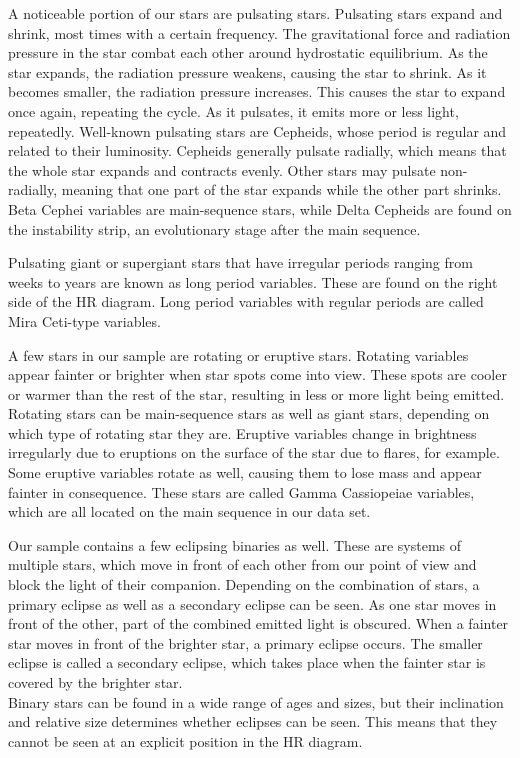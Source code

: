 \documentclass[onecolumn]{aa} %
\begin{document}
  A noticeable portion of our stars are pulsating stars.
  Pulsating stars expand and shrink, most times with a certain frequency. The gravitational force and radiation pressure in the star combat each other around hydrostatic equilibrium. As the star expands, the radiation pressure weakens, causing the star to shrink. As it becomes smaller, the radiation pressure increases. This causes the star to expand once again, repeating the cycle. As it pulsates, it emits more or less light, repeatedly.
Well-known pulsating stars are Cepheids, whose period is regular and related to their luminosity. Cepheids generally pulsate radially, which means that the whole star expands and contracts evenly. Other stars may pulsate non-radially, meaning that one part of the star expands while the other part shrinks. Beta Cephei variables are main-sequence stars, while Delta Cepheids are found on the instability strip, an evolutionary stage after the main sequence.

Pulsating giant or supergiant stars that have irregular periods ranging from weeks to years are known as long period variables. These are found on the right side of the HR diagram. Long period variables with regular periods are called Mira Ceti-type variables. 

A few stars in our sample are rotating or eruptive stars. Rotating variables appear fainter or brighter when star spots come into view. These spots are cooler or warmer than the rest of the star, resulting in less or more light being emitted. Rotating stars can be main-sequence stars as well as giant stars, depending on which type of rotating star they are. Eruptive variables change in brightness irregularly due to eruptions on the surface of the star due to flares, for example. Some eruptive variables rotate as well, causing them to lose mass and appear fainter in consequence. These stars are called Gamma Cassiopeiae variables, which are all located on the main sequence in our data set. 

Our sample contains a few eclipsing binaries as well. These are systems of multiple stars, which move in front of each other from our point of view and block the light of their companion. Depending on the combination of stars, a primary eclipse as well as a secondary eclipse can be seen. As one star moves in front of the other, part of the combined emitted light is obscured. When a fainter star moves in front of the brighter star, a primary eclipse occurs. The smaller eclipse is called a secondary eclipse, which takes place when the fainter star is covered by the brighter star.\\
Binary stars can be found in a wide range of ages and sizes, but their inclination and relative size determines whether eclipses can be seen. This means that they cannot be seen at an explicit position in the HR diagram.
\end{document}
